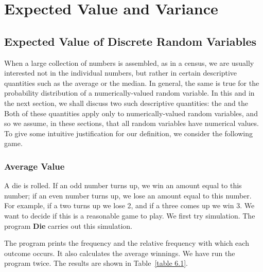 

\chapter{Expected Value and Variance}\label{chp 6}

\section[Expected Value]{Expected Value of Discrete Random Variables}\label{sec 6.1}

When a large collection of numbers is assembled, as in a census, we are usually
interested not in the individual numbers, but rather in certain descriptive
quantities such as the average or the median.  In general, the same is true for the
probability distribution of a numerically-valued random variable.  In this and in the
next section, we shall discuss two such descriptive quantities: the  and the    Both of these quantities apply only to
numerically-valued random variables, and so we assume, in these sections, that all
random variables have numerical values.  To give some intuitive justification for our
definition, we consider the following game.

\subsection*{Average Value}

A die is rolled.  If an odd number turns up, we win an amount equal to this number;
if an even number turns up, we lose an amount equal to this number.  For example, if
a two turns up we lose 2, and if a three comes up we win 3.  We want to decide if
this is a reasonable game to play.  We first try simulation.  The program {\bf Die} carries out this simulation.
\par
The program prints the frequency and the relative frequency with which each outcome
occurs.  It also calculates the average winnings.  We have run the program twice.  The results are
shown in Table~\ref{table 6.1}. 

